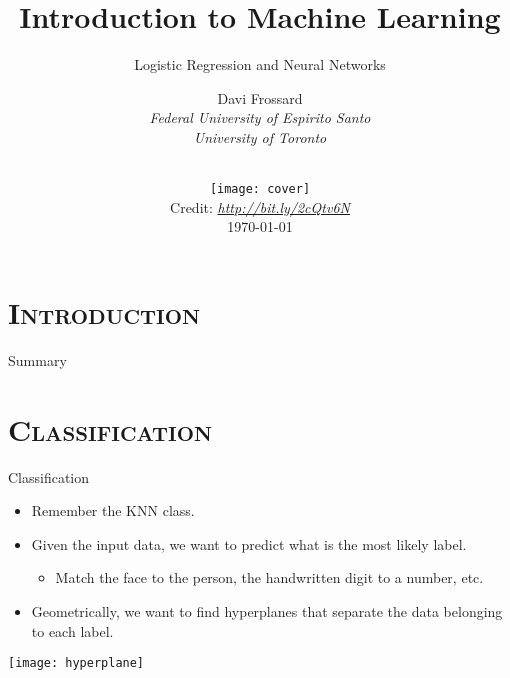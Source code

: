 


\section{\scshape Introduction}
\begin{frame}
\title{Introduction to Machine Learning}
\subtitle{Logistic Regression and Neural Networks}
\author{
Davi Frossard\\
{\it Federal University of Espirito Santo \\ University of Toronto}\\
}
\date{
\vspace{-2em}\\
\texttt{[image: cover]}\\[-1ex]
{\tiny Credit: {\itshape \url{http://bit.ly/2cQtv6N}}}
\\
\today
}
\titlepage
\end{frame}

\begin{frame}{Summary}
\tableofcontents
\end{frame}

\section{\scshape Classification}
\begin{frame}{Classification}
\begin{itemize}
\item Remember the KNN class.
\item Given the input data, we want to predict what is the most likely label.
    \begin{itemize}
    	\item Match the face to the person, the handwritten digit to a number, etc.
    \end{itemize}
\item Geometrically, we want to find hyperplanes that separate the data belonging to each label.
\end{itemize}
\begin{center}
\texttt{[image: hyperplane]}
\end{center}
\end{frame}


